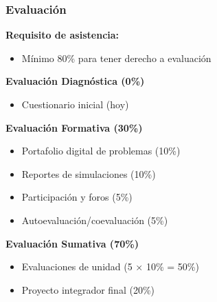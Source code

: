 \documentclass{beamer}
\begin{document}
\begin{frame}
    \frametitle{Evaluación}
    
    \textbf{Requisito de asistencia:}
    \begin{itemize}
        \item Mínimo 80\% para tener derecho a evaluación
    \end{itemize}
    \vspace{0.2cm}
    
    \textbf{Evaluación Diagnóstica (0\%)}
    \begin{itemize}
        \item Cuestionario inicial (hoy)
    \end{itemize}
    \vspace{0.2cm}
    
    \textbf{Evaluación Formativa (30\%)}
    \begin{itemize}
        \item Portafolio digital de problemas (10\%)
        \item Reportes de simulaciones (10\%)
        \item Participación y foros (5\%)
        \item Autoevaluación/coevaluación (5\%)
    \end{itemize}
    \vspace{0.2cm}
    
    \textbf{Evaluación Sumativa (70\%)}
    \begin{itemize}
        \item Evaluaciones de unidad (5 × 10\% = 50\%)
        \item Proyecto integrador final (20\%)
    \end{itemize}
\end{frame}
\end{document}
